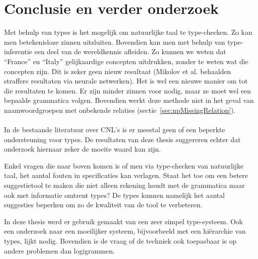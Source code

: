 \section{Conclusie en verder onderzoek}
Met behulp van types is het mogelijk om natuurlijke taal te type-checken. Zo kan men betekenisloze zinnen uitsluiten. Bovendien kan men met behulp van type-inferentie een deel van de wereldkennis afleiden. Zo kunnen we weten dat ``France'' en ``Italy'' gelijkaardige concepten uitdrukken, zonder te weten wat die concepten zijn. Dit is zeker geen nieuw resultaat (Mikolov et al. \cite{Mikolov2013} behaalden straffere resultaten via neurale netwerken). Het is wel een nieuwe manier om tot die resultaten te komen. Er zijn minder zinnen voor nodig, maar ze moet wel een bepaalde grammatica volgen. Bovendien werkt deze methode niet in het geval van naamwoordgroepen met onbekende relaties (sectie~\ref{sec:npMissingRelation}).

\paragraph{} In de bestaande literatuur over CNL's is er meestal geen of een beperkte ondersteuning voor types. De resultaten van deze thesis suggereren echter dat onderzoek hiernaar zeker de moeite waard kan zijn.

Enkel vragen die naar boven komen is of men via type-checken van natuurlijke taal, het aantal fouten in specificaties kan verlagen. Staat het toe om een betere suggestietool te maken die niet alleen rekening houdt met de grammatica maar ook met informatie omtrent types? De types kunnen namelijk het aantal suggesties beperken om zo de kwaliteit van de tool te verbeteren.

In deze thesis werd er gebruik gemaakt van een zeer simpel type-systeem. Ook een onderzoek naar een moeilijker systeem, bijvoorbeeld met een hiërarchie van types, lijkt nodig. Bovendien is de vraag of de techniek ook toepasbaar is op andere problemen dan logigrammen.
